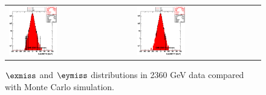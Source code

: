 \begin{figure}[h!]
 \centering
 \begin{tabular}{ll}
  \includegraphics[width=0.40\textwidth]{plots_DataVsMC_MB_2360GeV/h_calometPx.eps} &
  \includegraphics[width=0.40\textwidth]{plots_DataVsMC_MB_2360GeV/h_calometPy.eps} \\
 \end{tabular}
 \caption{$\exmiss$ and $\eymiss$ distributions in 2360 GeV data compared
   with Monte Carlo simulation.
          \label{fig:DataVsMC_MB_2360_2}}
\end{figure}

